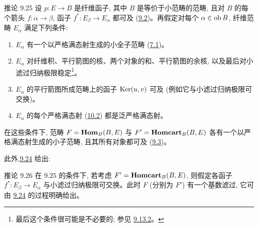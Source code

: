 \begin{enonce*}{推论 9.25}
设 $p:E\rightarrow B$ 是纤维函子, 其中 $B$ 是等价于小范畴的范畴, 且对 $B$ 的每个箭头 $f:\alpha\rightarrow\beta$, 函子 $f^\ast:E_\beta\rightarrow E_\alpha$ 都可及 (\hyperref[I.def9.2]{9.2})。再假定对每个 $\alpha\in\operatorname{ob} B$, 纤维范畴 $E_\alpha$ 满足下列条件:
\begin{enumerate}
\renewcommand{\theenumi}{\alph{enumi}}
\renewcommand{\labelenumi}{\theenumi)}
\item $E_\alpha$ 有一个以严格满态射生成的小全子范畴 (\hyperref[I.def7.1]{7.1})。

\item $E_\alpha$ 对纤维积、平行箭图的核、两个对象的和、平行箭图的余核, 以及最后对小滤过归纳极限稳定\footnote[1]{最后这个条件很可能是不必要的; 参见 \hyperref[I.rem9.13.2]{9.13.2}。}。

\item $E_\alpha$ 的平行箭图所成范畴上的函子 $\operatorname{Ker}(u,v)$ 可及 (例如它与小滤过归纳极限可交换)。

\item $E_\alpha$ 的每个严格满态射 (\hyperref[I.sec10.2]{10.2}) 都是泛严格满态射。
\end{enumerate}

在这些条件下, 范畴 $F=\operatorname{\mathbf{Hom}}_B(B,E)$ 与 $F'=\operatorname{\mathbf{Homcart}}_B(B,E)$ 各有一个以严格满态射生成的小子范畴, 且其所有对象都可及 (\hyperref[I.def9.3]{9.3})。
\end{enonce*}
此外,\pageoriginale \hyperref[I.cor9.24]{9.24} 给出:

\begin{enonce*}{推论 9.26}
在 $\hyperref[I.cor9.25]{9.25}$ 的条件下, 若考虑 $F'=\operatorname{\mathbf{Homcart}}_B(B,E)$, 则假定各函子 $f^\ast:E_\beta\rightarrow E_\alpha$ 与小滤过归纳极限可交换。此时 $F$ (分别为 $F'$) 有一个基数滤过, 它可由 \hyperref[I.cor9.24]{9.24} 的过程明确给出。
\end{enonce*}



